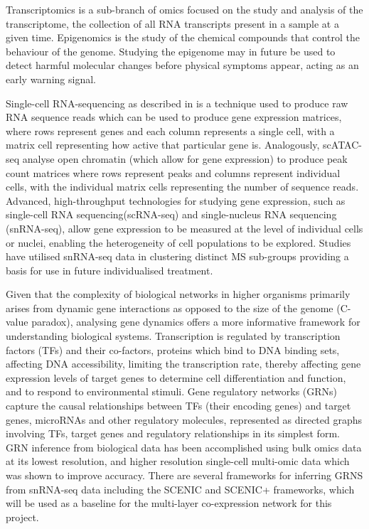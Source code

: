 \documentclass[12pt,a4paper]{report}
\begin{document}
Transcriptomics is a sub-branch of omics focused on the study and analysis of the transcriptome,
the collection of all RNA transcripts present in a sample at a given time. Epigenomics is the study
of the chemical compounds that control the behaviour of the genome. Studying the epigenome may
in future be used to detect harmful molecular changes before physical symptoms appear, acting as
an early warning signal\cite{alarconMetabolicEarlyWarning2025,lesterEmergenceDevelopmentalBehavioral2022}.

Single-cell RNA-sequencing as described in \citeauthor{lueckenCurrentBestPractices2019} is a technique used to produce raw RNA sequence reads which can be used to produce gene expression matrices, where rows represent genes and each column represents a single cell, with a matrix cell representing how active that particular gene is. Analogously, scATAC-seq analyse open chromatin (which allow for gene expression) to produce peak count matrices where rows represent peaks and columns represent individual cells, with the individual matrix cells representing the number of sequence reads. Advanced, high-throughput technologies for studying gene expression, such as single-cell RNA sequencing(scRNA-seq) and single-nucleus RNA sequencing (snRNA-seq), allow gene expression to be measured at the level of individual cells or nuclei, enabling the heterogeneity of cell populations to be explored. Studies have utilised snRNA-seq data in clustering distinct MS sub-groups\parencite{macnairSingleNucleiRNAseq2022} providing a basis for use in future individualised treatment.

Given that the complexity of biological networks in higher organisms primarily arises from dynamic gene interactions as opposed to the size of the genome (C-value paradox), analysing gene dynamics
offers a more informative framework for understanding biological systems. Transcription is regulated by transcription factors (TFs) and their co-factors, proteins which bind to DNA binding sets, affecting DNA accessibility, limiting the transcription rate, thereby affecting gene expression levels of target genes to determine cell differentiation and function, and to respond to environmental stimuli.  Gene regulatory networks (GRNs) capture the causal relationships between TFs (their encoding genes) and target genes, microRNAs and other regulatory molecules, represented as directed graphs involving TFs, target genes and regulatory relationships in its simplest form\parencite{badia-i-mompelGeneRegulatoryNetwork2023}. GRN inference from biological data has been accomplished using bulk omics data at its lowest resolution, and higher resolution single-cell multi-omic data which was shown to improve accuracy\cite{liuMultiGNNGraphNeural2025,yuanInferringGeneRegulatory2025}. There are several frameworks for inferring GRNS from snRNA-seq data including the SCENIC and SCENIC+ frameworks\parencite{aibarSCENICSinglecellRegulatory2017}, which will be used as a baseline for the multi-layer co-expression network for this project. 
\end{document}
